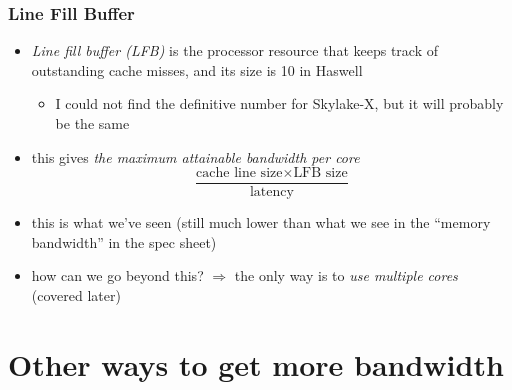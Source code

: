\documentclass[12pt,dvipdfmx]{beamer}
\newcommand{\ao}[1]{{\color{blue}#1}}
\begin{document}
\begin{frame}
\frametitle{Line Fill Buffer}
\begin{itemize}
\item<1-> \ao{\emph{Line fill buffer (LFB)}} is the processor resource that keeps track of outstanding cache misses, and its size is 10 in Haswell
  \begin{itemize}
  \item I could not find the definitive number for Skylake-X,
    but it will probably be the same
  \end{itemize}
\item<2-> this gives \ao{\em the maximum attainable bandwidth per core}
\[ \frac{\mbox{cache line size} \times \mbox{LFB size}}{\mbox{latency}} \]
\item<3-> this is what we've seen 
  (still much lower than what we see in the ``memory bandwidth'' in the spec sheet)
\item<4-> how can we go beyond this? $\Rightarrow$ 
  the only way is to \ao{\em use multiple cores} (covered later)
\end{itemize}
\end{frame}

\section{Other ways to get more bandwidth}
\end{document}
